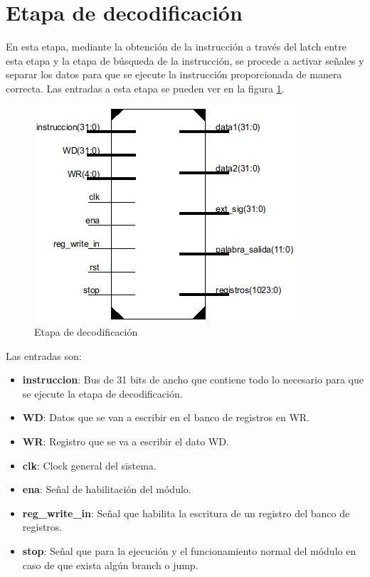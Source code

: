 \section{Etapa de decodificaci\'on}

En esta etapa, mediante la obtenci\'on de la instrucci\'on a trav\'es del latch entre esta etapa y la etapa de b\'usqueda de la instrucci\'on, se procede a activar señales y separar los datos para que se ejecute la instrucci\'on proporcionada de manera correcta.
Las entradas a esta etapa se pueden ver en la figura \ref{fig:decode}.

\begin{figure}[H]
\centering
\includegraphics[scale=0.5]{img/decode_stage}
\caption{Etapa de decodificaci\'on}
\label{fig:decode}
\end{figure}

 
Las entradas son: 
\begin{itemize}
  \item \textbf{instruccion}: Bus de 31 bits de ancho que contiene todo lo necesario para que se ejecute la etapa de decodificaci\'on.
  \item \textbf{WD}: Datos que se van a escribir en el banco de registros en WR.
  \item \textbf{WR}: Registro que se va a escribir el dato WD.
  \item \textbf{clk}: Clock general del sistema.
  \item \textbf{ena}: Señal de habilitaci\'on del m\'odulo.
  \item \textbf{reg\_write\_in}: Señal que habilita la escritura de un registro del banco de registros.
  \item \textbf{stop}: Señal que para la ejecuci\'on y el funcionamiento normal del m\'odulo en caso de que exista alg\'un branch o jump. 
\end{itemize}

